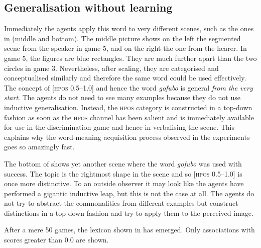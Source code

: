 \subsection{Generalisation without learning}

Immediately the agents apply this word to very 
different scenes, such as the ones in  (middle and bottom). The middle picture
shows on the left the segmented scene
from the speaker in game 5, and on the right the one
from the hearer. In game 5, the figures are blue
rectangles. They are much further apart than 
the two circles in game 3. Nevertheless, 
after scaling, they are categorised and
conceptualised similarly and therefore
the same word could be used effectively. The concept 
of [\textsc{hpos} 0.5–1.0] and hence the word \textit{gofubo} 
is general {\itshape from the very start}. 
The agents do not need to see many examples because they do 
not use inductive generalisation. Instead, 
the \textsc{hpos} category is constructed in a top-down fashion 
as soon as the \textsc{hpos} channel has been salient
and is immediately available for use in the 
discrimination game and hence in verbalising 
the scene. This explains why the word-meaning acquisition
process observed in the experiments goes so 
amazingly fast.

The bottom of 
shows yet another scene where the word \textit{gofubo} 
was used with success. The topic is the rightmost
shape in the scene and so [\textsc{hpos} 0.5–1.0] is once more 
distinctive. To an outside observer it may look 
like the agents have performed a gigantic inductive
leap, but this is not the case at all. The agents
do not try to abstract the commonalities from 
different examples but construct distinctions in a top 
down fashion and try to apply them to the perceived image. 

After a mere 50 games, the lexicon shown in  has emerged. Only
associations with scores greater than 0.0 are shown. 

